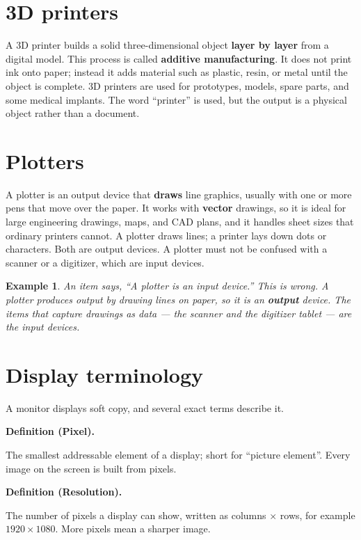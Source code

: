 \documentclass[11pt]{article}
\newtheorem{example}{Example}[section]
\newenvironment{definitionbox}[1]{%
  \par\noindent\textbf{Definition (#1).}\ \itshape
}{\par\vspace{0.3em}}
\begin{document}
\section{3D printers}
A 3D printer builds a solid three-dimensional object \textbf{layer by layer}
from a digital model. This process is called \textbf{additive
manufacturing}. It does not print ink onto paper; instead it adds material
such as plastic, resin, or metal until the object is complete. 3D printers
are used for prototypes, models, spare parts, and some medical implants. The
word ``printer'' is used, but the output is a physical object rather than a
document.

\section{Plotters}
A plotter is an output device that \textbf{draws} line graphics, usually with
one or more pens that move over the paper. It works with \textbf{vector}
drawings, so it is ideal for large engineering drawings, maps, and CAD plans,
and it handles sheet sizes that ordinary printers cannot. A plotter draws
lines; a printer lays down dots or characters. Both are output devices. A
plotter must not be confused with a scanner or a digitizer, which are input
devices.

\begin{example}
An item says, ``A plotter is an input device.'' This is wrong. A plotter
produces output by drawing lines on paper, so it is an \textbf{output}
device. The items that capture drawings as data --- the scanner and the
digitizer tablet --- are the input devices.
\end{example}

\section{Display terminology}
A monitor displays soft copy, and several exact terms describe it.

\begin{definitionbox}{Pixel}
The smallest addressable element of a display; short for ``picture element''.
Every image on the screen is built from pixels.
\end{definitionbox}

\begin{definitionbox}{Resolution}
The number of pixels a display can show, written as columns $\times$ rows,
for example $1920 \times 1080$. More pixels mean a sharper image.
\end{definitionbox}
\end{document}
